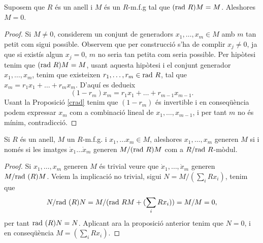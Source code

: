 \begin{theorem}
Suposem que $R$ és un anell i $M$ és un $R$-m.f.g tal que $(\mathrm{rad} \  R)M=M$. Aleshores $M=0$.
\end{theorem}

\begin{proof}
Si $M\neq 0$, considerem un conjunt de generadors $x_1,\dots ,x_m \in M$ amb $m$ tan petit com sigui possible. Observem que per construcció s'ha de complir $x_j\neq 0$, ja que si existís algun $x_j=0$, $m$ no seria tan petita com seria possible. Per hipòtesi tenim que $(\mathrm{rad} \  R) M = M$, usant aquesta hipòtesi i el conjunt generador $x_1,\dots , x_m$, tenim que existeixen $r_1, \dots ,r_m \in \mathrm{rad} \  R$, tal que $x_m=r_1x_1 + \dots + r_m x_m$. D'aquí es dedueix $$(1-r_m)x_m=r_1x_1+\dots + r_{m-1}x_{m-1}.$$
Usant la Proposició \ref{crad} tenim que $(1-r_m)$ és invertible i en conseqüència podem expressar $x_m$ com a combinació lineal de $x_1,\dots , x_{m-1}$, i per tant $m$ no és mínim, contradicció.
\end{proof}

\begin{corollary}\label{cNakayamas} Si $R$ és un anell, $M$ un $R$-m.f.g. i $x_1,\dots x_m \in M$, aleshores $x_1,\dots,x_m$ generen $M$ si i només si les imatges $\dot{x}_1\dots \dot{x}_m$ generen $M/(\mathrm{rad} \  R) M$ com a $R/\mathrm{rad} \  R$-mòdul.
\end{corollary}
\begin{proof}
Si $x_1,\dots ,x_m$ generen $M$ és trivial veure que $\dot{x}_1,\dots,\dot{x}_m$ generen $M/\mathrm{rad} \  (R)M$.
Veiem la implicació no trivial, sigui $N=M/(\sum_i Rx_i)$, tenim que $$N/\mathrm{rad} \ (R)N=M/(\mathrm{rad} \  R M + (\sum_i Rx_i))=M/M=0,$$ per tant $\mathrm{rad} \ (R)N=N$. Aplicant ara la proposició anterior tenim que $N=0$, i en conseqüència $M=(\sum_i Rx_i)$.

\end{proof}

